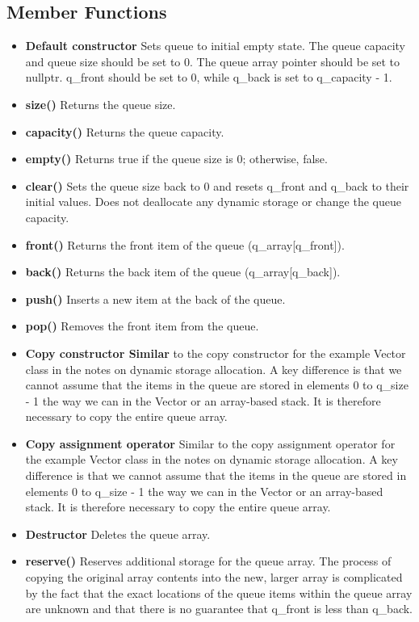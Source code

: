 \documentclass{report}
\begin{document}
    \subsection{Member Functions}
    \begin{itemize}
        \item \textbf{Default constructor} Sets queue to initial empty state. The queue capacity and queue size should be set to 0. The queue array pointer should be set to nullptr. q\_front should be set to 0, while q\_back is set to q\_capacity - 1.
        \item \textbf{size()} Returns the queue size.
        \item \textbf{capacity()} Returns the queue capacity.
        \item \textbf{empty()} Returns true if the queue size is 0; otherwise, false.
        \item \textbf{clear()} Sets the queue size back to 0 and resets q\_front and q\_back to their initial values. Does not deallocate any dynamic storage or change the queue capacity.
        \item \textbf{front()} Returns the front item of the queue (q\_array[q\_front]).
        \item \textbf{back()} Returns the back item of the queue (q\_array[q\_back]).
        \item \textbf{push()} Inserts a new item at the back of the queue.
        \item \textbf{pop()} Removes the front item from the queue.
        \item \textbf{Copy constructor Similar} to the copy constructor for the example Vector class in the notes on dynamic storage allocation. A key difference is that we cannot assume that the items in the queue are stored in elements 0 to q\_size - 1 the way we can in the Vector or an array-based stack. It is therefore necessary to copy the entire queue array.
        \item \textbf{Copy assignment operator} Similar to the copy assignment operator for the example Vector class in the notes on dynamic storage allocation. A key difference is that we cannot assume that the items in the queue are stored in elements 0 to q\_size - 1 the way we can in the Vector or an array-based stack. It is therefore necessary to copy the entire queue array.
        \item \textbf{Destructor} Deletes the queue array.
        \item \textbf{reserve()} Reserves additional storage for the queue array. The process of copying the original array contents into the new, larger array is complicated by the fact that the exact locations of the queue items within the queue array are unknown and that there is no guarantee that q\_front is less than q\_back.
    \end{itemize}
    \bigbreak \noindent 
\end{document}
